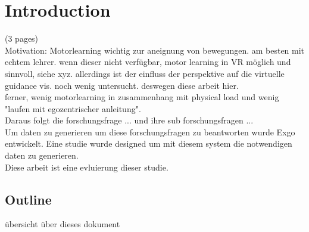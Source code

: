 \chapter{Introduction}
(3 pages)\\
Motivation: Motorlearning wichtig zur aneignung von bewegungen. am besten mit echtem lehrer. wenn dieser nicht verfügbar, motor learning in VR möglich und sinnvoll, siehe xyz. allerdings ist der einfluss der perspektive auf die virtuelle guidance vis. noch wenig untersucht. deswegen diese arbeit hier.\\
ferner, wenig motorlearning in zusammenhang mit physical load und wenig "laufen mit egozentrischer anleitung".\\
Daraus folgt die forschungsfrage ... und ihre sub forschungsfragen ...\\
Um daten zu generieren um diese forschungsfragen zu beantworten wurde Exgo entwickelt. Eine studie wurde designed um mit diesem system die notwendigen daten zu generieren.\\
Diese arbeit ist eine evluierung dieser studie.
\section{Outline}
übersicht über dieses dokument